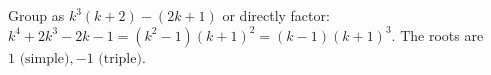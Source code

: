 Group as $k^3(k+2)-(2k+1)$ or directly factor: $k^4+2k^3-2k-1=(k^2-1)(k+1)^2=(k-1)(k+1)^3$. The roots are $\boxed{1\text{ (simple)},-1\text{ (triple)}}$.
